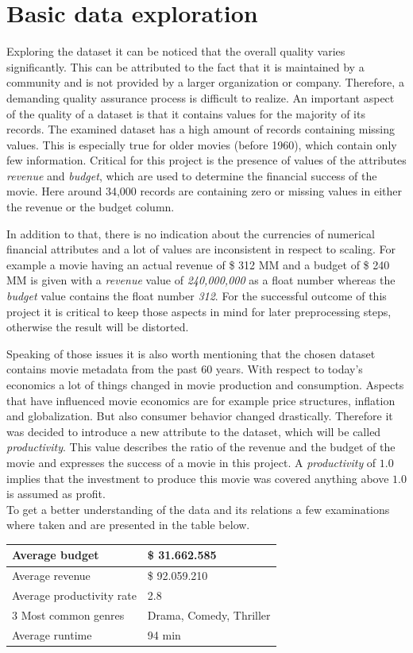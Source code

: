 \section{Basic data exploration}
\label{sec:data_exploration}
Exploring the dataset it can be noticed that the overall quality varies significantly. This can be attributed to the fact that it is maintained by a community and is not provided by a larger organization or company. Therefore, a demanding quality assurance process is difficult to realize. An important aspect of the quality of a dataset is that it contains values for the majority of its records. The examined dataset has a high amount of records containing missing values. This is especially true for older movies (before 1960), which contain only few information. Critical for this project is the presence of values of the attributes \textit{revenue} and \textit{budget}, which are used to determine the financial success of the movie. Here around 34,000 records are containing zero or missing values in either the revenue or the budget column.

In addition to that, there is no indication about the currencies of numerical financial attributes and a lot of values are inconsistent in respect to scaling. For example a movie having an actual revenue of \$ 312 MM and a budget of \$ 240 MM is given with a \textit{revenue} value of \textit{240,000,000} as a float number whereas the \textit{budget} value contains the float number \textit{312}. For the successful outcome of this project it is critical to keep those aspects in mind for later preprocessing steps, otherwise the result will be distorted.

Speaking of those issues it is also worth mentioning that the chosen dataset contains movie metadata from the past 60 years. With respect to today's economics a lot of things changed in movie production and consumption. Aspects that have influenced movie economics are for example price structures, inflation and globalization. But also consumer behavior changed drastically. Therefore it was decided to introduce a new attribute to the dataset, which will be called \textit{productivity}. This value describes the ratio of the revenue and the budget of the movie and expresses the success of a movie in this project. A \textit{productivity} of $1.0$ implies that the investment to produce this movie was covered anything above $1.0$ is assumed as profit.
\\

To get a better understanding of the data and its relations a few examinations where taken and are presented in the table below.
\begin{center}
	\begin{tabular}{| l | l |}
	\hline
	Average budget & \$ 31.662.585 \\ \hline
	Average revenue & \$ 92.059.210 \\ \hline
	Average productivity rate & 2.8 \\ \hline
	3 Most common genres & Drama, Comedy, Thriller \\ \hline
	Average runtime & 94 min \\ \hline
	\end{tabular}
\end{center} 